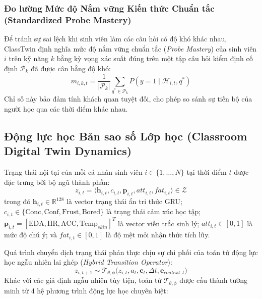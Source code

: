 \subsubsection{Đo lường Mức độ Nắm vững Kiến thức Chuẩn tắc (Standardized Probe Mastery)}
Để tránh sự sai lệch khi sinh viên làm các câu hỏi có độ khó khác nhau, ClassTwin định nghĩa mức độ nắm vững chuẩn tắc (\textit{Probe Mastery}) của sinh viên $i$ trên kỹ năng $k$ bằng kỳ vọng xác suất đúng trên một tập câu hỏi kiểm định cố định $\mathcal{P}_k$ đã được cân bằng độ khó:
\begin{equation}\label{eq:probe-mastery}
  m_{i, k, t} = \frac{1}{|\mathcal{P}_k|} \sum_{q^* \in \mathcal{P}_k} P(y = 1 \mid \mathcal{H}_{i, t}, q^*)
\end{equation}
Chỉ số này bảo đảm tính khách quan tuyệt đối, cho phép so sánh sự tiến bộ của người học qua các thời điểm khác nhau.

\subsection{Động lực học Bản sao số Lớp học (Classroom Digital Twin Dynamics)}\label{subsec:twin-dynamics}
Trạng thái nội tại của mỗi cá nhân sinh viên $i \in \{1, \dots, N\}$ tại thời điểm $t$ được đặc trưng bởi bộ ngũ thành phần:
\begin{equation}\label{eq:individual-state-tuple}
  z_{i, t} = \big\langle \mathbf{h}_{i, t}, c_{i, t}, \mathbf{p}_{i, t}, att_{i, t}, fat_{i, t} \big\rangle \in \mathcal{Z}
\end{equation}
trong đó $\mathbf{h}_{i, t} \in \mathbb{R}^{128}$ là vector trạng thái ẩn tri thức GRU; $c_{i, t} \in \{\text{Conc}, \text{Conf}, \text{Frust}, \text{Bored}\}$ là trạng thái cảm xúc học tập; $\mathbf{p}_{i, t} = [\text{EDA}, \text{HR}, \text{ACC}, \text{Temp}_{skin}]^T$ là vector viễn trắc sinh lý; $att_{i, t} \in [0, 1]$ là mức độ chú ý; và $fat_{i, t} \in [0, 1]$ là độ mệt mỏi nhận thức tích lũy.

Quá trình chuyển dịch trạng thái phản thực chịu sự chi phối của toán tử động lực học ngẫu nhiên lai ghép (\textit{Hybrid Transition Operator}):
\begin{equation}\label{eq:individual-transition}
  z_{i, t+1} \sim \mathcal{T}_{\theta, \phi}\big(z_{i, t}, a_t, \mathbf{c}_t, \Delta t, \mathbf{e}_{context, t}\big)
\end{equation}
Khác với các giả định ngẫu nhiên tùy tiện, toán tử $\mathcal{T}_{\theta, \phi}$ được cấu thành tường minh từ 4 hệ phương trình động lực học chuyên biệt:


